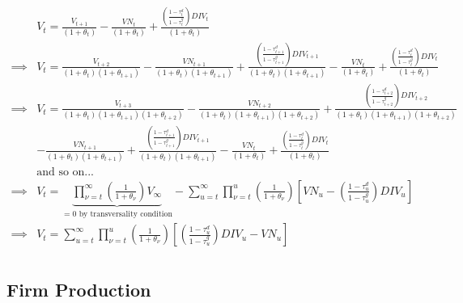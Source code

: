 \begin{equation}
\label{eqn:solve_vs}
\begin{split}
& V_{t}=\frac{V_{t+1}}{(1+\theta_{t})} - \frac{VN_{t}}{(1+\theta_{t})}  + \frac{\left(\frac{1-\tau^{d}_{t}}{1-\tau^{g}_{t}}\right)DIV_{t}}{(1+\theta_{t})} \\
\implies &  V_{t}=\frac{V_{t+2}}{(1+\theta_{t})(1+\theta_{t+1})} - \frac{VN_{t+1}}{(1+\theta_{t})(1+\theta_{t+1})}  + \frac{\left(\frac{1-\tau^{d}_{t+1}}{1-\tau^{g}_{t+1}}\right)DIV_{t+1}}{(1+\theta_{t})(1+\theta_{t+1})} - \frac{VN_{t}}{(1+\theta_{t})}  + \frac{\left(\frac{1-\tau^{d}_{t}}{1-\tau^{g}_{t}}\right)DIV_{t}}{(1+\theta_{t})} \\
\implies &  V_{t}= \frac{V_{t+3}}{(1+\theta_{t})(1+\theta_{t+1})(1+\theta_{t+2})} - \frac{VN_{t+2}}{(1+\theta_{t})(1+\theta_{t+1})(1+\theta_{t+2})}  + \frac{\left(\frac{1-\tau^{d}_{t+2}}{1-\tau^{g}_{t+2}}\right)DIV_{t+2}}{(1+\theta_{t})(1+\theta_{t+1})(1+\theta_{t+2})} \\
& - \frac{VN_{t+1}}{(1+\theta_{t})(1+\theta_{t+1})}  + \frac{\left(\frac{1-\tau^{d}_{t+1}}{1-\tau^{g}_{t+1}}\right)DIV_{t+1}}{(1+\theta_{t})(1+\theta_{t+1})} - \frac{VN_{t}}{(1+\theta_{t})}  + \frac{\left(\frac{1-\tau^{d}_{t}}{1-\tau^{g}_{t}}\right)DIV_{t}}{(1+\theta_{t})} \\
& \text{and so on...} \\
\implies & V_{t}=\underbrace{\prod_{\nu=t}^{\infty}\left(\frac{1}{1+\theta_{\nu}}\right)V_{\infty}}_{=0 \text{ by transversality condition}} - \sum_{u=t}^{\infty} \prod_{\nu=t}^{u}\left(\frac{1}{1+\theta_{\nu}}\right)\left[VN_{u} - \left(\frac{1-\tau^{d}_{u}}{1-\tau^{g}_{u}}\right)DIV_{u}\right]\\
\implies & V_{t}= \sum_{u=t}^{\infty} \prod_{\nu=t}^{u}\left(\frac{1}{1+\theta_{\nu}}\right)\left[ \left(\frac{1-\tau^{d}_{u}}{1-\tau^{g}_{u}}\right)DIV_{u}-VN_{u}\right]\\
\end{split}
\end{equation}

\subsection{Firm Production}

